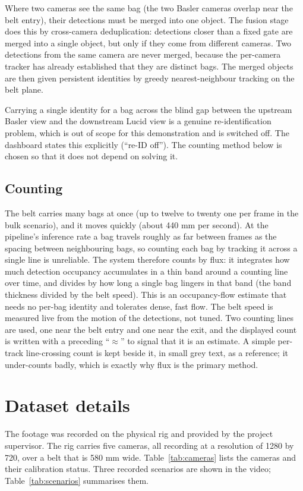 \documentclass[11pt,a4paper]{article}
\begin{document}
Where two cameras see the same bag (the two Basler cameras overlap near the belt
entry), their detections must be merged into one object. The fusion stage does
this by cross-camera deduplication: detections closer than a fixed gate are merged
into a single object, but only if they come from different cameras. Two detections
from the same camera are never merged, because the per-camera tracker has already
established that they are distinct bags. The merged objects are then given
persistent identities by greedy nearest-neighbour tracking on the belt plane.

Carrying a single identity for a bag across the blind gap between the upstream
Basler view and the downstream Lucid view is a genuine re-identification problem,
which is out of scope for this demonstration and is switched off. The dashboard
states this explicitly (``re-ID off''). The counting method below is chosen so
that it does not depend on solving it.

\subsection{Counting}

The belt carries many bags at once (up to twelve to twenty one per frame in the
bulk scenario), and it moves quickly (about 440 mm per second). At the pipeline's
inference rate a bag travels roughly as far between frames as the spacing between
neighbouring bags, so counting each bag by tracking it across a single line is
unreliable. The system therefore counts by flux: it integrates how much detection
occupancy accumulates in a thin band around a counting line over time, and divides
by how long a single bag lingers in that band (the band thickness divided by the
belt speed). This is an occupancy-flow estimate that needs no per-bag identity and
tolerates dense, fast flow. The belt speed is measured live from the motion of the
detections, not tuned. Two counting lines are used, one near the belt entry and
one near the exit, and the displayed count is written with a preceding ``$\approx$''
to signal that it is an estimate. A simple per-track line-crossing count is kept
beside it, in small grey text, as a reference; it under-counts badly, which is
exactly why flux is the primary method.

\section{Dataset details}

The footage was recorded on the physical rig and provided by the project
supervisor. The rig carries five cameras, all recording at a resolution of
1280 by 720, over a belt that is 580 mm wide. Table~\ref{tab:cameras} lists the
cameras and their calibration status. Three recorded scenarios are shown in the
video; Table~\ref{tab:scenarios} summarises them.
\end{document}
